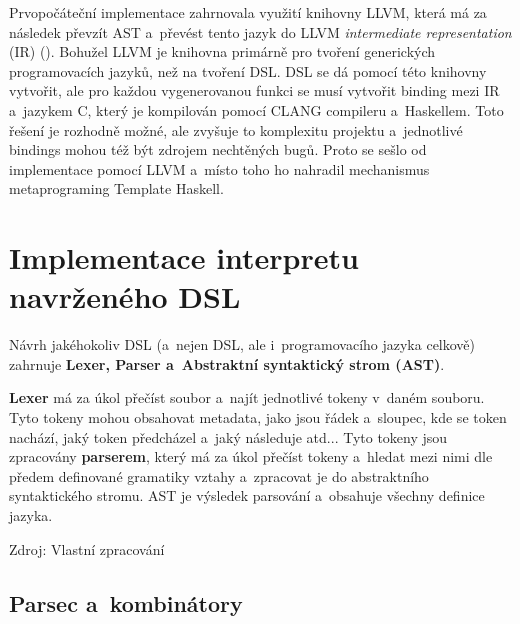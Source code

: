 \documentclass[male, czech]{kithesis}
\begin{document}
Prvopočáteční implementace zahrnovala využití knihovny LLVM,
která má za následek převzít AST
a~převést tento jazyk do LLVM \textit{intermediate representation} (IR) (\cite{IntroToLLVM}).
Bohužel LLVM je knihovna primárně pro tvoření generických programovacích jazyků, 
než na tvoření DSL. 
DSL se dá pomocí této knihovny vytvořit, 
ale pro každou vygenerovanou funkci se musí vytvořit binding mezi IR
a~jazykem C, 
který je kompilován pomocí CLANG compileru a~Haskellem. 
Toto řešení je rozhodně možné, 
ale zvyšuje to komplexitu projektu
a~jednotlivé bindings mohou též být zdrojem nechtěných bugů. 
Proto se sešlo od implementace pomocí LLVM
a~místo toho ho nahradil mechanismus metaprograming Template Haskell.


\chapter{Implementace interpretu navrženého DSL}

Návrh jakéhokoliv DSL (a~nejen DSL, ale i~programovacího jazyka celkově) zahrnuje
\textbf{Lexer, Parser a~Abstraktní syntaktický strom (AST)}.

\textbf{Lexer} má za úkol přečíst soubor
a~najít jednotlivé tokeny v~daném souboru.
Tyto tokeny mohou obsahovat metadata, 
jako jsou řádek a~sloupec, 
kde se token nachází,
jaký token předcházel a~jaký následuje atd... 
Tyto tokeny jsou zpracovány \textbf{parserem}, 
který má za úkol přečíst tokeny
a~hledat mezi nimi dle předem definované gramatiky vztahy
a~zpracovat je do abstraktního syntaktického stromu. 
AST je výsledek parsování
a~obsahuje všechny definice jazyka.

{\begin{center}
Zdroj: Vlastní zpracování
\end{center}
}

\section{Parsec a~kombinátory}
\end{document}
